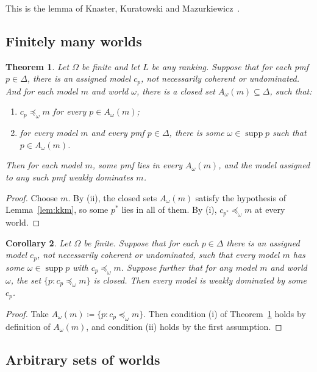 \documentclass[11pt]{article}
\newtheorem{theorem}{Theorem}[section]
\newtheorem{corollary}[theorem]{Corollary}
\theoremstyle{definition}
\newcommand{\supp}{\operatorname{supp}}
\begin{document}
This is the lemma of Knaster, Kuratowski and Mazurkiewicz~\cite{KKM1929}.




\subsection{Finitely many worlds}
\begin{theorem}\label{thm:finite}
Let $\Omega$ be finite and let $L$ be any ranking. Suppose that for each pmf $p\in\Delta$, there is an assigned model $c_p$, not necessarily coherent or undominated. And for each model $m$ and world $\omega$, there is a closed set $A_\omega(m)\subseteq\Delta$, such that:
\begin{enumerate}[label=(\roman*)]
\item $c_p\preceq_\omega m$ for every $p\in A_\omega(m)$;
\item for every model $m$ and every pmf $p\in\Delta$, there is some $\omega\in\supp p$ such that $p\in A_\omega(m)$.
\end{enumerate}
Then for each model $m$, some pmf lies in every $A_\omega(m)$, and the model assigned to any such pmf weakly dominates $m$.
\end{theorem}
\begin{proof}
Choose $m$. By (ii), the closed sets $A_\omega(m)$ satisfy the hypothesis of Lemma~\ref{lem:kkm}, so some $p^*$ lies in all of them. By (i), $c_{p^*}\preceq_\omega m$ at every world.
\end{proof}

\begin{corollary}\label{cor:closed-choice}
Let $\Omega$ be finite. Suppose that for each $p\in\Delta$ there is an assigned model $c_p$, not necessarily coherent or undominated, such that every model $m$ has some $\omega\in\supp p$ with $c_p\preceq_\omega m$. Suppose further that for any model $m$ and world $\omega$, the set $\{p:c_p\preceq_\omega m\}$ is closed. Then every model is weakly dominated by some $c_p$.
\end{corollary}
\begin{proof}
Take $A_\omega(m)\coloneqq\{p:c_p\preceq_\omega m\}$. Then condition (i) of Theorem~\ref{thm:finite} holds by definition of $A_\omega(m)$, and condition (ii) holds by the first assumption.
\end{proof}

\subsection{Arbitrary sets of worlds}
\end{document}
